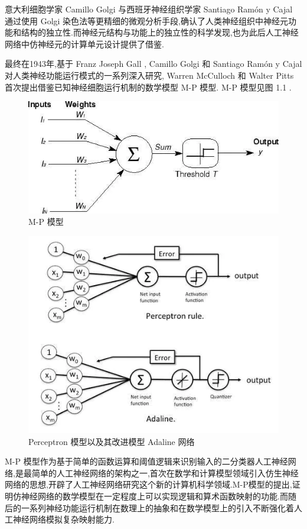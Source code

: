 意大利细胞学家 Camillo Golgi 与西班牙神经组织学家 Santiago Ramón y Cajal 通过使用 Golgi 染色法等更精细的微观分析手段,确认了人类神经组织中神经元功能和结构的独立性.而神经元结构与功能上的独立性的科学发现,也为此后人工神经网络中仿神经元的计算单元设计提供了借鉴.

最终在1943年,基于 Franz Joseph Gall , Camillo Golgi 和 Santiago Ramón y Cajal 对人类神经功能运行模式的一系列深入研究, Warren McCulloch 和 Walter Pitts 首次提出借鉴已知神经细胞运行机制的数学模型 M-P 模型. M-P 模型见图 1.1 .

\begin{figure}
	\centering
	\includegraphics[scale=0.7]{Figures/mpmodel.png}
	\caption{M-P 模型}
\end{figure}
\begin{figure}
	\centering
	\includegraphics[scale=0.7]{Figures/perceptron.png}
	\caption{Perceptron 模型以及其改进模型 Adaline 网络}
\end{figure}

M-P 模型作为基于简单的函数运算和阈值逻辑来识别输入的二分类器人工神经网络,是最简单的人工神经网络的架构之一,首次在数学和计算模型领域引入仿生神经网络的思想,开辟了人工神经网络研究这个新的计算机科学领域.M-P模型的提出,证明仿神经网络的数学模型在一定程度上可以实现逻辑和算术函数映射的功能.而随后的一系列神经功能运行机制在数理上的抽象和在数学模型上的引入不断强化着人工神经网络模拟复杂映射能力.

